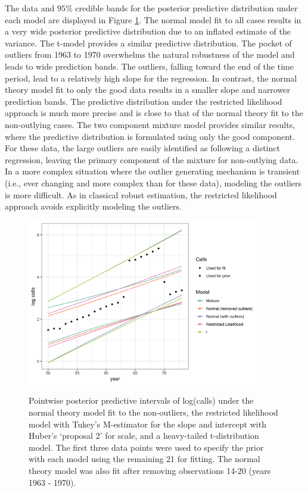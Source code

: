 \documentclass[ba]{imsart}
\begin{document}
The data and  $95\%$ credible bands for the posterior predictive distribution under each model are displayed in Figure \ref{fig:calls_predictive}. The normal model fit to all cases results in a very wide posterior predictive distribution due to an inflated estimate of the variance. The t-model provides a similar predictive distribution.  The pocket of outliers from 1963 to 1970 overwhelms the natural robustness of the model and leads to wide prediction bands.  The outliers, falling toward the end of the time period, lead to a relatively high slope for the regression.  In contrast, the normal theory model fit to only the good data results in a smaller slope and narrower prediction bands.  The predictive distribution under the restricted likelihood approach is much more precise and is close to that of the normal theory fit to the non-outlying cases. The two component mixture model provides similar results, where the predictive distribution is formulated using only the good component. For these data, the large outliers are easily identified as following a distinct regression, leaving the primary component of the mixture for non-outlying data.  In a more complex situation where the outlier generating mechanism is transient (i.e., ever changing and more complex than for these data), modeling the outliers is more difficult. As in classical robust estimation, the restricted likelihood approach avoids explicitly modeling the outliers. 
\begin{figure}[t]
\centering
{\includegraphics[width = 4in]{figs/calls_predictive.png}}
\caption{Pointwise posterior predictive intervals of log(calls) under the normal theory model fit to the non-outliers, the restricted likelihood model with Tukey's M-estimator for the slope and intercept with Huber's `proposal 2'  for scale, and a heavy-tailed t-distribution model. The first three data points were used to specify the prior with each model using the remaining 21 for fitting. The normal theory model was also fit after removing observations 14-20 (years 1963 - 1970).}
\label{fig:calls_predictive}
\end{figure}
\end{document}
